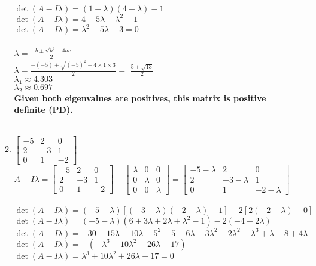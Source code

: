 \documentclass{assignment}
\begin{document}
\begin{problem}
\begin{enumerate}
\begin{enumerate}[label=\alph*)]
    $\det(A - I\lambda) = (1-\lambda)(4-\lambda)-1$\\
    $\det(A - I\lambda) = 4-5\lambda + \lambda^2 - 1$\\
    $\det(A - I\lambda) = \lambda^2 - 5\lambda + 3 = 0$\\\\

    $\lambda=\frac{-b \pm \sqrt{b^2-4ac}}{2}$\\
    $\lambda=\frac{-(-5) \pm \sqrt{(-5)^2-4 \times1 \times 3}}{2} = $
    $\frac{5 \pm \sqrt{13}}{2}$\\
    $\lambda_1 \approx 4.303$\\
    $\lambda_2 \approx 0.697$\\
    
    \textbf{Given both eigenvalues are positives, this matrix is positive definite (PD).}\\\\

    \item $\begin{bmatrix}
        -5&2&0\\
        2&-3&1\\
        0&1&-2
    \end{bmatrix}$\\

    $A-I\lambda = \begin{bmatrix}
        -5&2&0\\
        2&-3&1\\
        0&1&-2
    \end{bmatrix} - \begin{bmatrix}
        \lambda&0&0\\0&\lambda&0\\0&0&\lambda
    \end{bmatrix} = \begin{bmatrix}
        -5-\lambda&2&0\\2&-3-\lambda&1\\0&1&-2-\lambda
    \end{bmatrix}$\\\\

    $\det(A - I\lambda) = (-5-\lambda)[(-3-\lambda)(-2-\lambda)-1] - 2[2(-2-\lambda)-0]$\\
    $\det(A - I\lambda) = (-5-\lambda)(6+3\lambda+2\lambda+\lambda^2-1) -2(-4-2\lambda)$\\
    $\det(A - I\lambda) = -30-15\lambda-10\lambda-5^2+5-6\lambda-3\lambda^2-2\lambda^2-\lambda^3+\lambda+8+4\lambda$\\
    $\det(A - I\lambda) = -(-\lambda^3 - 10\lambda^2-26\lambda-17)$\\
    $\det(A - I\lambda) = \lambda^3 + 10\lambda^2+26\lambda+17 = 0$
    \\


\end{enumerate}
\end{enumerate}
\end{problem}
\end{document}
